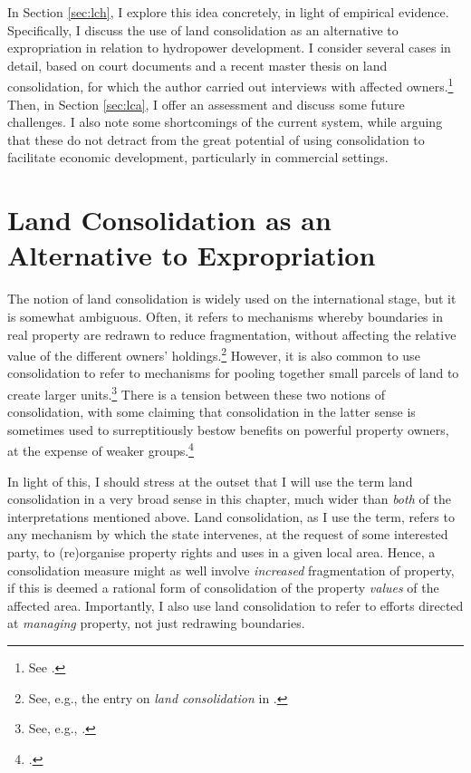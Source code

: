 {In Section \ref{sec:lch}, I explore this idea concretely, in light of empirical evidence. Specifically, I discuss the use of land consolidation as an alternative to expropriation in relation to hydropower development. I consider several cases in detail, based on court documents and a recent master thesis on land consolidation, for which the author carried out interviews with affected owners.\footnote{See \cite{stokstad11}.} Then, in Section \ref{sec:lca}, I offer an assessment and discuss some future challenges. I also note some shortcomings of the current system, while arguing that these do not detract from the great potential of using consolidation to facilitate economic development, particularly in commercial settings.
}

\section{Land Consolidation as an Alternative to Expropriation}\label{sec:lce}

The notion of land consolidation is widely used on the international stage, but it is somewhat ambiguous. Often, it refers to mechanisms whereby boundaries in real property are redrawn to reduce fragmentation, without affecting the relative value of the different owners' holdings.\footnote{See, e.g., the entry on {\it land consolidation} in \cite{mayhew09}.} However, it is also common to use consolidation to refer to mechanisms for pooling together small parcels of land to create larger units.\footnote{See, e.g., \cite{lerman06}.} There is a tension between these two notions of consolidation, with some claiming that consolidation in the latter sense is sometimes used to surreptitiously bestow benefits on powerful property owners, at the expense of weaker groups.\footcite[237-239]{lipton09}

In light of this, I should stress at the outset that I will use the term land consolidation in a very broad sense in this chapter, much wider than {\it both} of the interpretations mentioned above. Land consolidation, as I use the term, refers to any mechanism by which the state intervenes, at the request of some interested party, to (re)organise property rights and uses in a given local area. Hence, a consolidation measure might as well involve {\it increased} fragmentation of property, if this is deemed a rational form of consolidation of the property {\it values} of the affected area. Importantly, I also use land consolidation to refer to efforts directed at {\it managing} property, not just redrawing boundaries.

